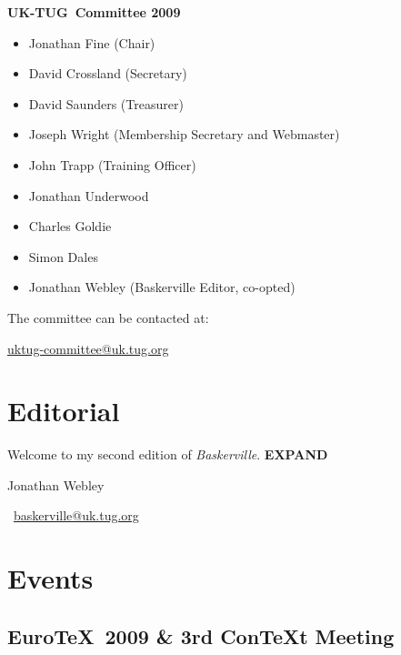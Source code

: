 \documentclass[a4paper,twoside,twocolumn]{article}
\def \ukt {UK-TUG}
\newcommand{\BV}{\textit{Baskerville}}
\begin{document}
\vspace{0.5cm}
\noindent \textbf{\ukt\ Committee 2009}

\begin{itemize}
   \setlength{\parskip}{1pt} %
   \item Jonathan Fine (Chair)
   \item David Crossland (Secretary)
   \item David Saunders (Treasurer)
   \item Joseph Wright (Membership Secretary and Webmaster)
   \item John Trapp (Training Officer)
   \item Jonathan Underwood
   \item Charles Goldie
   \item Simon Dales
   \item Jonathan Webley (Baskerville Editor, co-opted)
\end{itemize}
The  committee can be contacted at:
\begin{center}
\href{mailto:uktug-committee@uk.tug.org}{uktug-committee@uk.tug.org}
\end{center}

\section{Editorial}
Welcome to my second edition of \BV. \textbf{EXPAND}

\hfill Jonathan Webley

\hfill \ \href{mailto:baskerville@uk.tug.org}{baskerville@uk.tug.org}

\section{Events}

\subsection{Euro\TeX\ 2009 \& 3rd Con\TeX t Meeting}
\end{document}
